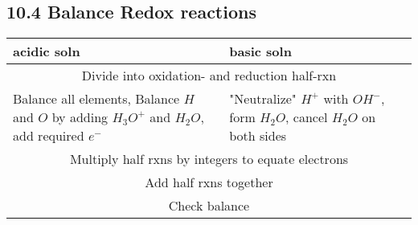 \subsection{10.4 Balance Redox reactions}

\begin{tabular}{p{32mm} | p{32mm}}
    \textbf{acidic soln} & \textbf{basic soln}\\
    \hline
    \multicolumn{2}{c}{Divide into oxidation- and reduction half-rxn}\\
    Balance all elements, Balance $H$ and $O$ by adding $H_3O^+$ and $H_2O$, add required $e^-$ & "Neutralize" $H^+$ with $OH^-$, form $H_2O$, cancel $H_2O$ on both sides\\
    \multicolumn{2}{c}{Multiply half rxns by integers to equate electrons}\\
    \multicolumn{2}{c}{Add half rxns together}\\
    \multicolumn{2}{c}{Check balance}
\end{tabular}